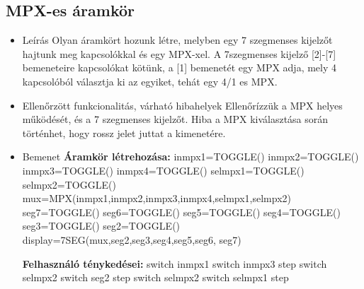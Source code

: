 \subsection{MPX-es áramkör}
\begin{itemize}
\item Leírás\newline
Olyan áramkört hozunk létre, melyben egy 7 szegmenses kijelzőt hajtunk meg kapcsolókkal és egy MPX-xel. A 7szegmenses kijelző [2]-[7] bemeneteire kapcsolókat kötünk, a [1] bemenetét egy MPX adja, mely 4 kapcsolóból választja ki az egyiket, tehát egy 4/1 es MPX.
\item Ellenőrzött funkcionalitás, várható hibahelyek\newline
Ellenőrízzük a MPX helyes működését, és a 7 szegmenses kijelzőt. Hiba a MPX kiválasztása során történhet, hogy rossz jelet juttat a kimenetére.
\item Bemenet\newline
\newline
{\bf Áramkör létrehozása:}\newline
inmpx1=TOGGLE()\newline
inmpx2=TOGGLE()\newline
inmpx3=TOGGLE()\newline
inmpx4=TOGGLE()\newline
selmpx1=TOGGLE()\newline
selmpx2=TOGGLE()\newline
mux=MPX(inmpx1,inmpx2,inmpx3,inmpx4,selmpx1,selmpx2)\newline
seg7=TOGGLE()\newline
seg6=TOGGLE()\newline
seg5=TOGGLE()\newline
seg4=TOGGLE()\newline
seg3=TOGGLE()\newline
seg2=TOGGLE()\newline
display=7SEG(mux,seg2,seg3,seg4,seg5,seg6, seg7)\newline

{\bf Felhasználó ténykedései:}\newline
switch inmpx1\newline
switch inmpx3\newline
step\newline
switch selmpx2\newline
switch seg2\newline
step\newline
switch selmpx2\newline
switch selmpx1\newline
step\newline


\end{itemize}
